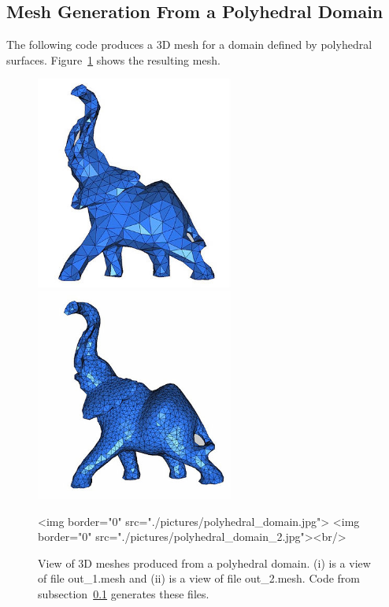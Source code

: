 \subsection{Mesh Generation From a Polyhedral Domain}
\label{Mesh_3_subsection_examples_polyhedral}
The following code produces a 3D mesh for a domain
defined by polyhedral surfaces. Figure~\ref{figure:polyhedral_domain}
shows the resulting mesh.


\begin{figure}[ht]
\begin{center}
 \begin{ccTexOnly}
   \includegraphics[height=7cm]{Mesh_3/pictures/polyhedral_domain}
   \includegraphics[height=7cm]{Mesh_3/pictures/polyhedral_domain_2}
 \end{ccTexOnly}
 \begin{ccHtmlOnly}
   <img border="0" src="./pictures/polyhedral_domain.jpg">
   <img border="0" src="./pictures/polyhedral_domain_2.jpg"><br/>
 \end{ccHtmlOnly}
 \caption{View of 3D meshes produced from a polyhedral domain. (i) 
   is a view of file out\_1.mesh and (ii) is a view of file
   out\_2.mesh. Code from
   subsection~\ref{Mesh_3_subsection_examples_polyhedral} generates
   these files.}
  \label{figure:polyhedral_domain}
\end{center}
\end{figure}


